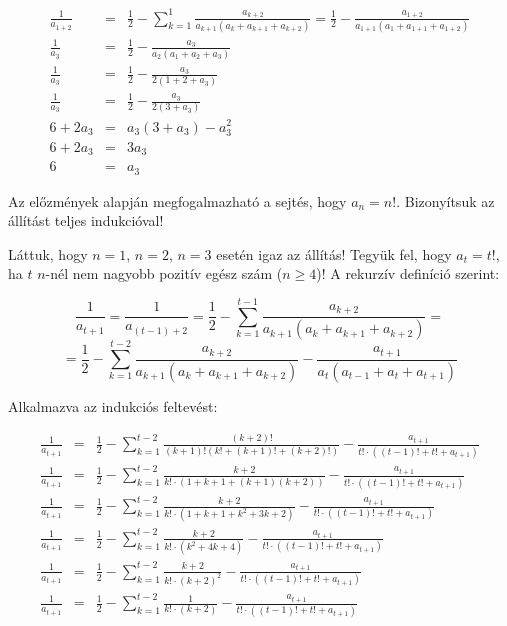 \documentclass[a4paper,10pt]{article}
\begin{document}
\begin{eqnarray*}
\frac{1}{a_{1+2}}
&=&
\frac{1}{2}-\sum_{k=1}^1 \frac{a_{k+2}}{a_{k+1}\left(a_k+a_{k+1}+a_{k+2}\right)} =
\frac{1}{2}-\frac{a_{1+2}}{a_{1+1}\left(a_1+a_{1+1}+a_{1+2}\right)}\\
\frac{1}{a_{3}}
&=&
\frac{1}{2}-\frac{a_{3}}{a_{2}\left(a_1+a_{2}+a_{3}\right)}\\
\frac{1}{a_{3}}
&=&
\frac{1}{2}-\frac{a_{3}}{2\left(1+2+a_{3}\right)}\\ 
\frac{1}{a_{3}}
&=&
\frac{1}{2}-\frac{a_{3}}{2\left(3+a_{3}\right)}\\
6+2a_3
&=&
a_3(3+a_3)-a_3^2\\
6+2a_3
&=&
3a_3\\
6
&=&
a_3
\end{eqnarray*}


Az előzmények alapján megfogalmazható a sejtés, 
hogy $a_n = n!$. Bizonyítsuk az állítást teljes
indukcióval!

Láttuk, hogy $n = 1$, $n = 2$, $n = 3$ esetén igaz az állítás! Tegyük fel, hogy $a_t = t!$, ha $t$ $n$-nél
nem nagyobb pozitív egész szám ($n \ge 4$)!
A rekurzív definíció szerint:

$$\frac{1}{a_{t+1}}=\frac{1}{a_{(t-1)+2}}=
\frac{1}{2}-\sum_{k=1}^{t-1} \frac{a_{k+2}}{a_{k+1}(a_k+a_{k+1}+a_{k+2})}=
$$
$$
=\frac{1}{2}-\sum_{k=1}^{t-2} \frac{a_{k+2}}{a_{k+1}(a_k+a_{k+1}+a_{k+2})}
-\frac{a_{t+1}}{a_{t}(a_{t-1}+a_t+a_{t+1})}
$$

Alkalmazva az indukciós feltevést:

\begin{eqnarray*}
\frac{1}{a_{t+1}}&=& 
\frac{1}{2}-\sum_{k=1}^{t-2} \frac{(k+2)!}{(k+1)!(k!+(k+1)!+(k+2)!)}
-\frac{a_{t+1}}{t!\cdot((t-1)!+t!+a_{t+1})}\\
\frac{1}{a_{t+1}}&=& 
\frac{1}{2}-\sum_{k=1}^{t-2} \frac{k+2}{k!\cdot(1+k+1+(k+1)(k+2))}
-\frac{a_{t+1}}{t!\cdot((t-1)!+t!+a_{t+1})}\\
\frac{1}{a_{t+1}}&=& 
\frac{1}{2}-\sum_{k=1}^{t-2} \frac{k+2}{k!\cdot(1+k+1+k^2+3k+2)}
-\frac{a_{t+1}}{t!\cdot((t-1)!+t!+a_{t+1})}\\
\frac{1}{a_{t+1}}&=& 
\frac{1}{2}-\sum_{k=1}^{t-2} \frac{k+2}{k!\cdot(k^2+4k+4)}
-\frac{a_{t+1}}{t!\cdot((t-1)!+t!+a_{t+1})}\\
\frac{1}{a_{t+1}}&=& 
\frac{1}{2}-\sum_{k=1}^{t-2} \frac{k+2}{k!\cdot(k+2)^2}
-\frac{a_{t+1}}{t!\cdot((t-1)!+t!+a_{t+1})}\\
\frac{1}{a_{t+1}}&=& 
\frac{1}{2}-\sum_{k=1}^{t-2} \frac{1}{k!\cdot(k+2)}
-\frac{a_{t+1}}{t!\cdot((t-1)!+t!+a_{t+1})}
\end{eqnarray*}
\end{document}
